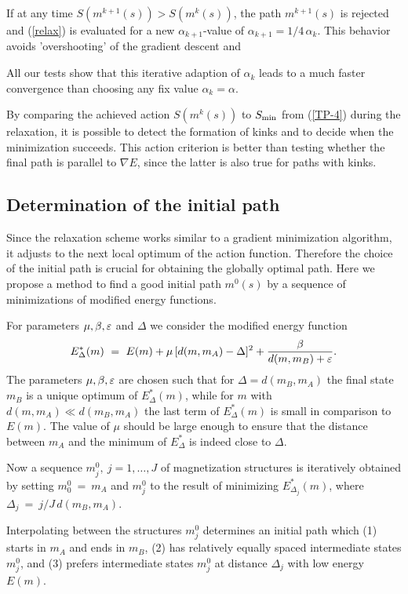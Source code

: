 If at any time $ S( m^{k+1}(s)) > S( m^{k}(s))$, 
the path $ m^{k+1}(s)$ is rejected and (\ref{relax})
is evaluated for 
a new  $\alpha_{k+1}$-value  of
$\alpha_{k+1}=1/4\,\alpha_k$.
This behavior avoids 'overshooting' of the gradient descent and 


All our tests show that this iterative adaption of $\alpha_k$ 
leads to a  much faster convergence than
choosing any fix value $\alpha_k=\alpha$.
 
By comparing the achieved action $S( m^{k}(s))$ to $ S_{\rm min}$ from
(\ref{TP-4})
during the relaxation, it is possible to detect  the 
formation of kinks and to decide when the minimization succeeds.
This action criterion is better than testing whether 
the final path is parallel to $\nabla E$, since
the latter is also true for paths with kinks.
 
\subsection{Determination of the initial path}
Since the relaxation scheme works similar to a gradient
minimization algorithm, it adjusts to the next local optimum of the
action function.
Therefore the choice of the initial path is crucial for obtaining the globally
optimal path.
Here we propose a  method to find a good initial path $m^0(s)$ by
a sequence of minimizations of modified energy functions.

For parameters $\mu, \beta, \varepsilon$ and $\Delta$ we consider the
modified energy function
\begin{equation}\label{modEn}
   E^\ast_\Delta(m) ~=~
         E(m) + \mu \,[ d(m, m_A) -\Delta]^2 + \frac{\beta}{d(m,m_B)+\varepsilon}.
\end{equation}
The parameters  $\mu, \beta, \varepsilon$ are chosen such that
for $\Delta=d(m_B, m_A) $ the final state $m_B$ is a unique
optimum of $E^\ast_\Delta(m)$, while for $m$ with  $d(m , m_A) \ll d(m_B, m_A)$ the last term of
$E^\ast_\Delta(m)$ is small in comparison to $E(m)$.
The value of $\mu$ should be large enough to ensure that the distance between
$m_A$ and the minimum of
$E^\ast_\Delta$ is indeed close to $\Delta$.

Now a sequence $m^0_j,~j=1,\ldots, J$ of magnetization structures is iteratively
obtained by setting $m^0_0~=~m_A$ and
$m^0_{j}$ to the result of minimizing $E^\ast_{\Delta_j} (m)$, where
$\Delta_j~=~j/J\,d(m_B, m_A)$.

Interpolating between the  structures  $m^0_j$ determines an
initial path  which (1) starts in $m_A$ and ends in $m_B$,
(2) has relatively equally spaced
intermediate states $m^0_{j}$, and (3) prefers
 intermediate states $m^0_{j}$ at distance $\Delta_j$ with low energy $E(m)$.
